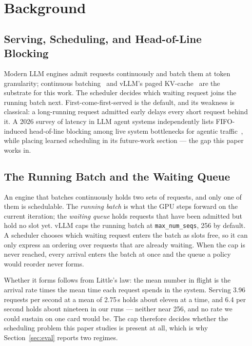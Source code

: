 \section{Background}

\subsection{Serving, Scheduling, and Head-of-Line Blocking}
Modern LLM engines admit requests continuously and batch them at
token granularity; continuous batching~\cite{orca2022} and vLLM's paged
KV-cache~\cite{vllm2023} are the substrate for this work. The scheduler decides which waiting request joins
the running batch next. First-come-first-served is the default, and its
weakness is classical: a long-running request admitted early delays every
short request behind it. A 2026 survey of latency in LLM agent systems
independently lists FIFO-induced head-of-line blocking among live system
bottlenecks for agentic traffic~\cite{park2026minimizing}, while placing
learned scheduling in its future-work section --- the gap this paper works in.

\subsection{The Running Batch and the Waiting Queue}
An engine that batches continuously holds two sets of requests, and only one
of them is schedulable. The \emph{running batch} is what the GPU steps
forward on the current iteration; the \emph{waiting queue} holds requests
that have been admitted but hold no slot yet. vLLM caps the running batch at
\texttt{max\_num\_seqs}, 256 by default. A scheduler chooses which waiting
request enters the batch as slots free, so it can only express an ordering
over requests that are already waiting. When the cap is never reached, every
arrival enters the batch at once and the queue a policy would reorder never
forms.

Whether it forms follows from Little's law: the mean number in flight is the
arrival rate times the mean time each request spends in the system. Serving
3.96 requests per second at a mean of 2.75\,s holds about eleven at a time,
and 6.4 per second holds about nineteen in our runs --- neither near 256, and
no rate we could sustain on one card would be. The cap therefore decides
whether the scheduling problem this paper studies is present at all, which is
why Section~\ref{sec:eval} reports two regimes.

